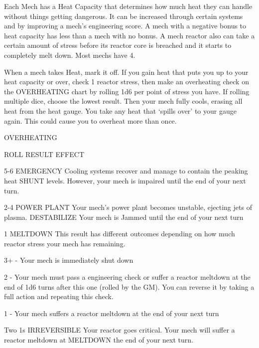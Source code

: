 Each Mech has a Heat Capacity that determines how much heat they can handle without things  
getting dangerous. It can be increased through certain systems and by improving a mech’s  
engineering score. A mech with a negative bonus to heat capacity has less than a mech with no  
bonus. A mech reactor also can take a certain amount of stress before its reactor core is  
breached and it starts to completely melt down. Most mechs have 4.
 

When a mech takes Heat, mark it off. If you gain heat that puts you up to your heat capacity or  
over, check 1 reactor stress, then make an overheating check on the OVERHEATING chart by  
rolling 1d6 per point of stress you have. If rolling multiple dice, choose the lowest result. Then  
your mech fully cools, erasing all heat from the heat gauge. You take any heat that ‘spills over’ to  
your gauge again. This could cause you to overheat more than once.
 

                                                OVERHEATING
 

 ROLL       RESULT                  EFFECT 

 5-6        EMERGENCY               Cooling systems recover and manage to contain the peaking heat  
            SHUNT                   levels. However, your mech is impaired until the end of your next turn. 

 2-4        POWER PLANT             Your mech’s power plant becomes unstable, ejecting jets of plasma.  
            DESTABILIZE             Your mech is Jammed until the end of your next turn 

 1          MELTDOWN                This result has different outcomes depending on how much reactor  
                                    stress your mech has remaining.
 
                                    3+ - Your mech is immediately shut down
 
                                    2 - Your mech must pass a engineering check or suffer a reactor  
                                    meltdown at the end of 1d6 turns after this one (rolled by the GM). You  
                                    can reverse it by taking a full action and repeating this check.
 
                                    1 - Your mech suffers a reactor meltdown at the end of your next turn 

 Two 1s     IRREVERSIBLE            Your reactor goes critical. Your mech will suffer a reactor meltdown at  
            MELTDOWN                the end of your next turn. 


